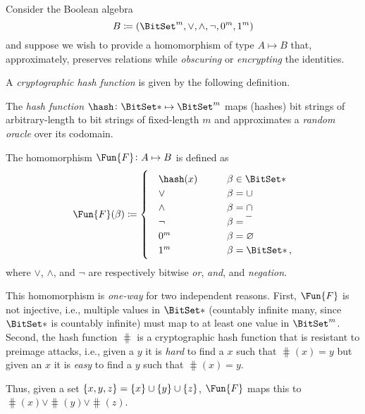 \documentclass[ ../main.tex]{subfiles}
\begin{document}
Consider the Boolean algebra
\begin{equation}
	B \coloneqq \left(\BitSet^m, \lor, \land, \neg, 0^m, 1^m\right)
\end{equation}
and suppose we wish to provide a homomorphism of type $A \mapsto B$ that, approximately, preserves relations while \emph{obscuring} or \emph{encrypting} the identities.

A \emph{cryptographic hash function} is given by the following definition.
\begin{definition}
	The \emph{hash function} $\hash \colon {\BitSet*} \mapsto \BitSet^m$ maps (hashes) bit
	strings of arbitrary-length to bit strings of fixed-length $m$ and approximates
	a \emph{random oracle} over its codomain.
\end{definition}

\begin{definition}
The homomorphism $\Fun{F} \colon A \mapsto B$ is defined as
\begin{equation}
\Fun{F}(\beta) \coloneqq
\begin{cases} 
	\quad \hash(x) 		& \qquad \beta \in {\BitSet*}\\
	\quad \lor 			& \qquad \beta = \SetUnion \\
	\quad \land 		& \qquad \beta = \SetIntersection\\
	\quad \neg			& \qquad \beta = \SetComplement\\
	\quad 0^m			& \qquad \beta = \EmptySet\\
	\quad 1^m			& \qquad \beta = {\BitSet*}\,,
\end{cases}
\end{equation}
where $\lor$, $\land$, and $\neg$ are respectively bitwise \emph{or}, \emph{and}, and \emph{negation}.
\end{definition}

This homomorphism is \emph{one-way} for two independent reasons.
First, $\Fun{F}$ is not injective, i.e., multiple values in $\BitSet*$ (countably infinite many, since $\BitSet*$ is countably infinite) must map to at least one value in $\BitSet^m$.
Second, the hash function $\hash$ is a cryptographic hash function that is resistant to preimage attacks, i.e., given a $y$ it is \emph{hard} to find a $x$ such that $\hash(x) = y$ but given an $x$ it is \emph{easy} to find a $y$ such that $\hash(x) = y$.

Thus, given a set $\{x,y,z\} = \{x\} \SetUnion \{y\} \SetUnion \{z\}$, $\Fun{F}$ maps this to $\hash(x) \lor \hash(y) \lor \hash(z)$.
\end{document}
